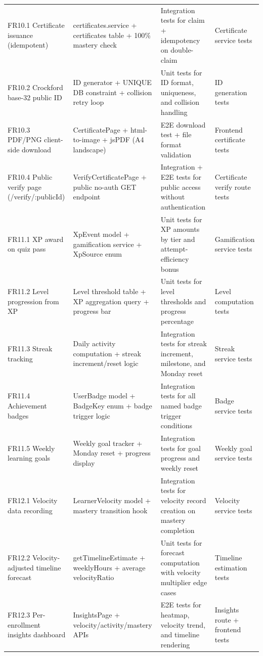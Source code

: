 \begin{longtable}{p{3cm}p{3.5cm}p{3cm}p{4.5cm}}
FR10.1 Certificate issuance (idempotent) & certificates.service + certificates table + 100\% mastery check & Integration tests for claim + idempotency on double-claim & Certificate service tests \\
FR10.2 Crockford base-32 public ID & ID generator + UNIQUE DB constraint + collision retry loop & Unit tests for ID format, uniqueness, and collision handling & ID generation tests \\
FR10.3 PDF/PNG client-side download & CertificatePage + html-to-image + jsPDF (A4 landscape) & E2E download test + file format validation & Frontend certificate tests \\
FR10.4 Public verify page (/verify/:publicId) & VerifyCertificatePage + public no-auth GET endpoint & Integration + E2E tests for public access without authentication & Certificate verify route tests \\
FR11.1 XP award on quiz pass & XpEvent model + gamification service + XpSource enum & Unit tests for XP amounts by tier and attempt-efficiency bonus & Gamification service tests \\
FR11.2 Level progression from XP & Level threshold table + XP aggregation query + progress bar & Unit tests for level thresholds and progress percentage & Level computation tests \\
FR11.3 Streak tracking & Daily activity computation + streak increment/reset logic & Integration tests for streak increment, milestone, and Monday reset & Streak service tests \\
FR11.4 Achievement badges & UserBadge model + BadgeKey enum + badge trigger logic & Integration tests for all named badge trigger conditions & Badge service tests \\
FR11.5 Weekly learning goals & Weekly goal tracker + Monday reset + progress display & Integration tests for goal progress and weekly reset & Weekly goal service tests \\
FR12.1 Velocity data recording & LearnerVelocity model + mastery transition hook & Integration tests for velocity record creation on mastery completion & Velocity service tests \\
FR12.2 Velocity-adjusted timeline forecast & getTimelineEstimate + weeklyHours + average velocityRatio & Unit tests for forecast computation with velocity multiplier edge cases & Timeline estimation tests \\
FR12.3 Per-enrollment insights dashboard & InsightsPage + velocity/activity/mastery APIs & E2E tests for heatmap, velocity trend, and timeline rendering & Insights route + frontend tests \\

\end{longtable}
